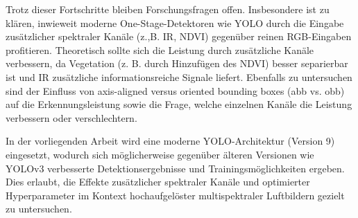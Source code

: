 Trotz dieser Fortschritte bleiben Forschungsfragen offen. Insbesondere ist zu klären, inwieweit moderne One-Stage-Detektoren wie \acrshort{YOLO} durch die Eingabe zusätzlicher spektraler Kanäle (z.,B. \Acrfull{IR}, \acrshort{NDVI}) gegenüber reinen \acrshort{RGB}-Eingaben profitieren. Theoretisch sollte sich die Leistung durch zusätzliche Kanäle verbessern, da Vegetation (z. B. durch Hinzufügen des \acrshort{NDVI}) besser separierbar ist und \acrshort{IR} zusätzliche informationsreiche Signale liefert. Ebenfalls zu untersuchen sind der Einfluss von axis-aligned versus oriented bounding boxes (\acrshort{abb} vs. \acrshort{obb}) auf die Erkennungsleistung sowie die Frage, welche einzelnen Kanäle die Leistung verbessern oder verschlechtern. 

In der vorliegenden Arbeit wird eine moderne YOLO-Architektur (Version 9) eingesetzt, wodurch sich möglicherweise gegenüber älteren Versionen wie YOLOv3 verbesserte Detektionsergebnisse und Trainingsmöglichkeiten ergeben. Dies erlaubt, die Effekte zusätzlicher spektraler Kanäle und optimierter Hyperparameter im Kontext hochaufgelöster multispektraler Luftbildern gezielt zu untersuchen.




